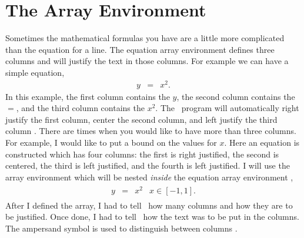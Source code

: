 \section{The Array Environment}
Sometimes the mathematical formulas you have are a little more complicated
than the equation for a line.  The equation array environment defines
three columns and will justify the  text in those columns.  For 
example we can have a simple equation,
\begin{eqnarray}
y & = & x^2.
\end{eqnarray}
In this example, the first column contains the $y$, the second column
contains the $=$, and the third column contains the $x^2$.  The \lat\
program will automatically right justify the first column, center the
second column, and left justify the third column \cite{The-Manual}.
There are times when you would like to have more than three columns.
For example, I would like to put a bound on the values for $x$.  Here
an equation is constructed which has four columns: the first is right
justified, the second is centered, the third is left justified, and
the fourth is left justified.  I will use the array environment which
will be nested {\it inside} the equation array environment
\cite{The-Manual},
\begin{eqnarray}
    \begin{array}{rcll}
       y & = & x^2 & x \in [-1,1].
    \end{array}
\end{eqnarray}
After I defined the array, I had to tell \lat\ how many columns
and how they are to be justified.  Once done, I had to tell
\lat\ how the text was to be put in the columns.  The ampersand
symbol is used to distinguish between columns \cite{The-Manual}.

